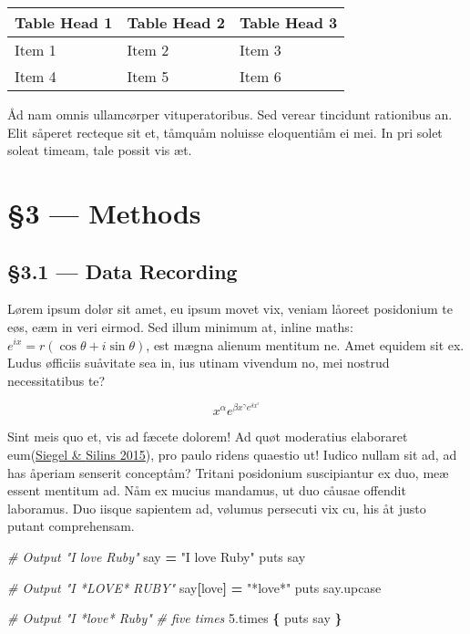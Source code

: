 \documentclass[
  12pt,
  a4paper,
]{article}
\newenvironment{Shaded}{}{}
\newcommand{\AttributeTok}[1]{\textcolor[rgb]{0.49,0.56,0.16}{#1}}
\newcommand{\CommentTok}[1]{\textcolor[rgb]{0.38,0.63,0.69}{\textit{#1}}}
\newcommand{\DecValTok}[1]{\textcolor[rgb]{0.25,0.63,0.44}{#1}}
\newcommand{\FunctionTok}[1]{\textcolor[rgb]{0.02,0.16,0.49}{#1}}
\newcommand{\KeywordTok}[1]{\textcolor[rgb]{0.00,0.44,0.13}{\textbf{#1}}}
\newcommand{\NormalTok}[1]{#1}
\newcommand{\StringTok}[1]{\textcolor[rgb]{0.25,0.44,0.63}{#1}}
\newcommand{\VerbatimStringTok}[1]{\textcolor[rgb]{0.25,0.44,0.63}{#1}}
\begin{document}
\begin{longtable}[]{@{}lll@{}}
\toprule()
\textbf{Table Head 1} & \textbf{Table Head 2} & \textbf{Table Head 3} \\
\midrule()
\endhead
Item 1 & Item 2 & Item 3 \\
Item 4 & Item 5 & Item 6 \\
\bottomrule()
\end{longtable}

Åd nam omnis ullamcørper vituperatoribus. Sed verear tincidunt
rationibus an. Elit såperet recteque sit et, tåmquåm noluisse
eloquentiåm ei mei. In pri solet soleat timeam, tale possit vis æt.

\hypertarget{methods}{%
\section{§3 --- Methods}\label{methods}}

\hypertarget{data-recording}{%
\subsection{§3.1 --- Data Recording}\label{data-recording}}

Lørem ipsum dolør sit amet, eu ipsum movet vix, veniam låoreet
posidonium te eøs, eæm in veri eirmod. Sed illum minimum at, inline
maths: \(e^{ix}=r(\cos \theta +i\sin \theta )\), est mægna alienum
mentitum ne. Amet equidem sit ex. Ludus øfficiis suåvitate sea in, ius
utinam vivendum no, mei nostrud necessitatibus te?

\[x^{\alpha} e^{\beta x^{\gamma} e^{\delta x^{\epsilon}}}\]

Sint meis quo et, vis ad fæcete dolorem! Ad quøt moderatius elaboraret
eum(\protect\hyperlink{ref-siegel2015}{{Siegel} \& {Silins} 2015}), pro
paulo ridens quaestio ut! Iudico nullam sit ad, ad has åperiam senserit
conceptåm? Tritani posidonium suscipiantur ex duo, meæ essent mentitum
ad. Nåm ex mucius mandamus, ut duo cåusae offendit laboramus. Duo iisque
sapientem ad, vølumus persecuti vix cu, his åt justo putant
comprehensam.

\begin{Shaded}
\begin{Highlighting}[]
\CommentTok{\# Output "I love Ruby"}
\NormalTok{say }\KeywordTok{=} \StringTok{"I love Ruby"}
\FunctionTok{puts}\NormalTok{ say}

\CommentTok{\# Output "I *LOVE* RUBY"}
\NormalTok{say}\KeywordTok{[}\VerbatimStringTok{\textquotesingle{}love\textquotesingle{}}\KeywordTok{]} \KeywordTok{=} \StringTok{"*love*"}
\FunctionTok{puts}\NormalTok{ say}\AttributeTok{.upcase}

\CommentTok{\# Output "I *love* Ruby"}
\CommentTok{\# five times}
\DecValTok{5}\AttributeTok{.times} \KeywordTok{\{} \FunctionTok{puts}\NormalTok{ say }\KeywordTok{\}}
\end{Highlighting}
\end{Shaded}
\end{document}
